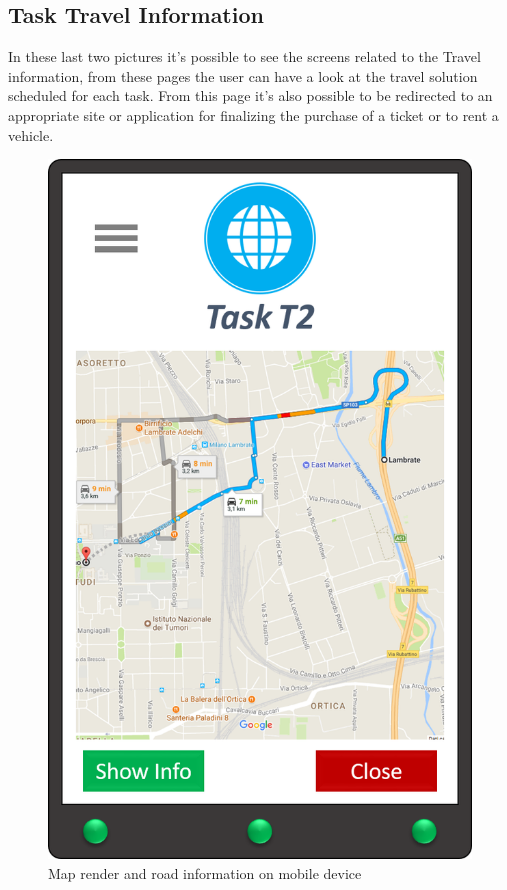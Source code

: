 \subsection{Task Travel Information}
In these last two pictures it's possible to see the screens related to the Travel information, from these pages the user can have a look at the travel solution scheduled for each task. From this page it's also possible to be redirected to an appropriate site or application for finalizing the purchase of a ticket or to rent a vehicle.   

\begin{figure}[H]
    \centering
    \includegraphics[scale=0.3]{Pictures/Mockups/AppMap.png}
    \caption{Map render and road information on mobile device}
\end{figure}

